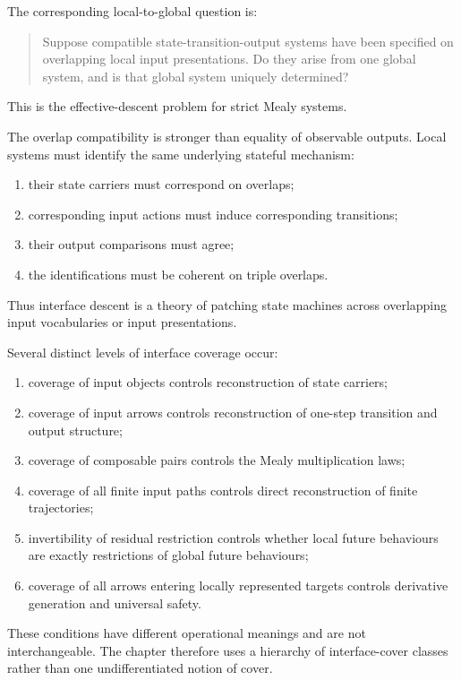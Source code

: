 The corresponding local-to-global question is:

\begin{quote}
Suppose compatible state-transition-output systems have been specified on
overlapping local input presentations. Do they arise from one global system,
and is that global system uniquely determined?
\end{quote}

This is the effective-descent problem for strict Mealy systems.

The overlap compatibility is stronger than equality of observable outputs.
Local systems must identify the same underlying stateful mechanism:
\begin{enumerate}
    \item their state carriers must correspond on overlaps;
    \item corresponding input actions must induce corresponding transitions;
    \item their output comparisons must agree;
    \item the identifications must be coherent on triple overlaps.
\end{enumerate}

Thus interface descent is a theory of patching state machines across
overlapping input vocabularies or input presentations.

Several distinct levels of interface coverage occur:
\begin{enumerate}
    \item coverage of input objects controls reconstruction of state carriers;
    \item coverage of input arrows controls reconstruction of one-step
    transition and output structure;
    \item coverage of composable pairs controls the Mealy multiplication laws;
    \item coverage of all finite input paths controls direct reconstruction of
    finite trajectories;
    \item invertibility of residual restriction controls whether local future
    behaviours are exactly restrictions of global future behaviours;
    \item coverage of all arrows entering locally represented targets controls
    derivative generation and universal safety.
\end{enumerate}

These conditions have different operational meanings and are not
interchangeable. The chapter therefore uses a hierarchy of interface-cover
classes rather than one undifferentiated notion of cover.

